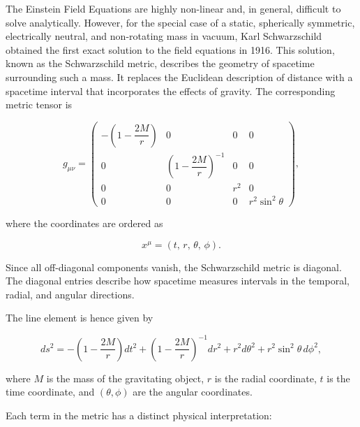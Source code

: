 \documentclass[12pt]{article}
\begin{document}
The Einstein Field Equations are highly non-linear and, in general, difficult to solve analytically. However, for the special case of a static, spherically symmetric, electrically neutral, and non-rotating mass in vacuum, Karl Schwarzschild obtained the first exact solution to the field equations in 1916. This solution, known as the Schwarzschild metric, describes the geometry of spacetime surrounding such a mass. It replaces the Euclidean description of distance with a spacetime interval that incorporates the effects of gravity.
The corresponding metric tensor is

\begin{equation}
g_{\mu\nu}
=
\begin{pmatrix}
-\left(1-\dfrac{2M}{r}\right) & 0 & 0 & 0\\[0.8em]
0 & \left(1-\dfrac{2M}{r}\right)^{-1} & 0 & 0\\[0.8em]
0 & 0 & r^2 & 0\\[0.8em]
0 & 0 & 0 & r^2\sin^2\theta
\end{pmatrix},
\end{equation}

where the coordinates are ordered as

\[
x^\mu = (t,\, r,\, \theta,\, \phi).
\]

Since all off-diagonal components vanish, the Schwarzschild metric is diagonal. The diagonal entries describe how spacetime measures intervals in the temporal, radial, and angular directions.

The line element is hence given by

\begin{equation}
ds^2
=
-\left(1-\frac{2M}{r}\right)dt^2
+
\left(1-\frac{2M}{r}\right)^{-1}dr^2
+
r^2d\theta^2
+
r^2\sin^2\theta\,d\phi^2,
\end{equation}

where $M$ is the mass of the gravitating object, $r$ is the radial coordinate, $t$ is the time coordinate, and $(\theta,\phi)$ are the angular coordinates.

Each term in the metric has a distinct physical interpretation:
\end{document}
